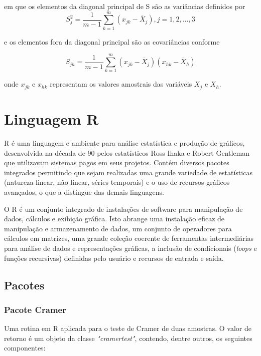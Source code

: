em que os elementos da diagonal principal de S são as variâncias definidos por
\begin{equation}
S^2_j = \frac{1}{m-1} \sum_{k=1}^m (x_{jk} - \overline{X}_j),    j = 1, 2, ..., 3 
\label{eq:eq7}
\end{equation}

e os elementos fora da diagonal principal são as covariâncias conforme

\begin{equation}
S_{jh} = \frac{1}{m-1} \sum_{k=1}^m (x_{jk} - \overline{X}_j)(x_{hk} - \overline{X}_h) 
\label{eq:eq8}
\end{equation}

onde $x_{jk}$ e $x_{hk}$ representam os valores amostrais das variáveis $X_j$ e $X_h$.

\chapter{Linguagem R}

R é uma linguagem e ambiente para análise estatística e produção de gráficos, desenvolvida na década de 90 pelos estatísticos Ross Ihaka e Robert Gentleman que utilizavam sistemas pagos em seus projetos. Contém diversos pacotes integrados permitindo que sejam realizadas uma grande variedade de estatísticas (natureza linear, não-linear, séries temporais) e o uso de recursos gráficos avançados, o que a distingue das demais linguagens. 

O R é um conjunto integrado de instalações de software para manipulação de dados, cálculos e exibição gráfica. Isto abrange uma instalação eficaz de manipulação e armazenamento de dados, um conjunto de operadores para cálculos em matrizes, uma grande coleção coerente de ferramentas intermediárias para análise de dados e representações gráficas, a inclusão de condicionais (\textit{loops} e funções recursivas) definidas pelo usuário e recursos de entrada e saída.  

\section{Pacotes}

\subsection{Pacote Cramer}
Uma rotina em R aplicada para o teste de Cramer de duas amostras. O valor de retorno é um objeto da classe \textit{"cramertest"}, contendo, dentre outros, os seguintes componentes:

